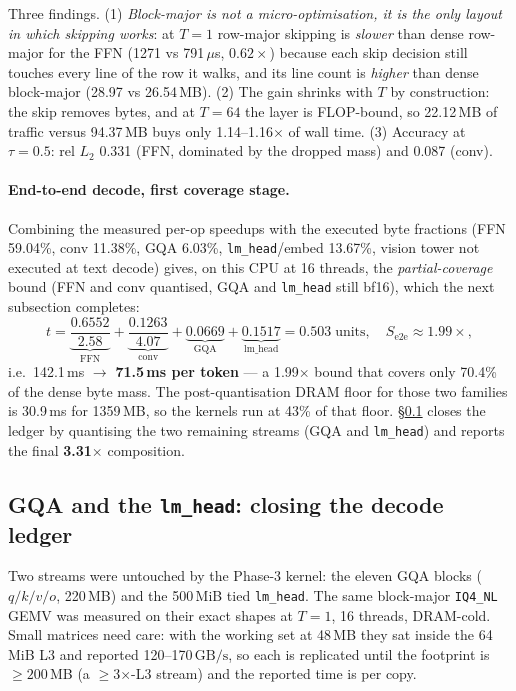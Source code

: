 \documentclass[11pt]{article}
\newcommand{\code}[1]{\texttt{\small #1}}
\newcommand{\gbps}{\ensuremath{\,\mathrm{GB/s}}}
\begin{document}
Three findings. (1) \emph{Block-major is not a micro-optimisation, it is the only layout in
which skipping works}: at $T{=}1$ row-major skipping is \emph{slower} than dense row-major
for the FFN (1271 vs 791\,$\mu$s, $0.62\times$) because each skip decision still touches
every line of the row it walks, and its line count is \emph{higher} than dense block-major
(28.97 vs 26.54\,MB). (2) The gain shrinks with $T$ by construction: the skip removes
bytes, and at $T{=}64$ the layer is FLOP-bound, so 22.12\,MB of traffic versus 94.37\,MB
buys only 1.14--1.16$\times$ of wall time. (3) Accuracy at $\tau{=}0.5$: rel $L_2$ 0.331
(FFN, dominated by the dropped mass) and 0.087 (conv).

\paragraph{End-to-end decode, first coverage stage.} Combining the measured per-op
speedups with the executed byte fractions (FFN 59.04\%, conv 11.38\%, GQA 6.03\%,
\code{lm\_head}/embed 13.67\%, vision tower not executed at text decode) gives, on this CPU
at 16 threads, the \emph{partial-coverage} bound (FFN and conv quantised, GQA and
\code{lm\_head} still bf16), which the next subsection completes:
\begin{equation}
t=\underbrace{\frac{0.6552}{2.58}}_{\text{FFN}}+\underbrace{\frac{0.1263}{4.07}}_{\text{conv}}
+\underbrace{0.0669}_{\text{GQA}}+\underbrace{0.1517}_{\text{lm\_head}}=0.503\;\text{units},
\quad S_{\text{e2e}}\approx\mathbf{1.99\times},
\end{equation}
i.e.\ 142.1\,ms $\rightarrow$ \textbf{71.5\,ms per token} --- a 1.99$\times$ bound that
covers only 70.4\% of the dense byte mass. The post-quantisation DRAM floor for those two
families is 30.9\,ms for 1359\,MB, so the kernels run at 43\% of that floor.
\S\ref{sec:ledger} closes the ledger by quantising the two remaining streams (GQA and
\code{lm\_head}) and reports the final \textbf{3.31$\times$} composition.

\subsection{GQA and the \code{lm\_head}: closing the decode ledger}\label{sec:ledger}
Two streams were untouched by the Phase-3 kernel: the eleven GQA blocks ($q/k/v/o$, 220\,MB)
and the 500\,MiB tied \code{lm\_head}. The same block-major \code{IQ4\_NL} GEMV was measured
on their exact shapes at $T{=}1$, 16 threads, DRAM-cold. Small matrices need care: with the
working set at 48\,MB they sat inside the 64\,MiB L3 and reported 120--170\gbps, so each is
replicated until the footprint is $\ge200$\,MB (a $\ge$3$\times$-L3 stream) and the reported
time is per copy.
\end{document}
